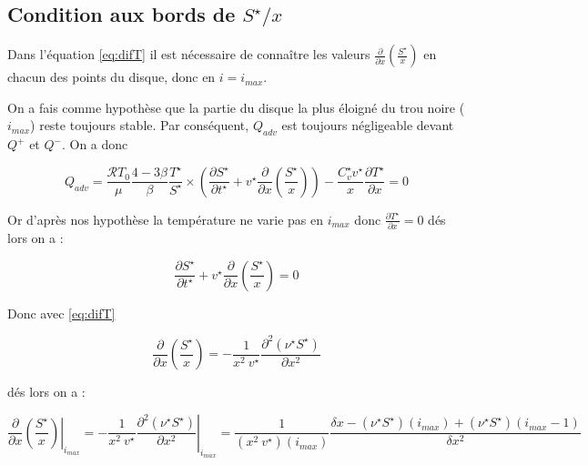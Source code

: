 \subsection{Condition aux bords de $S^{\star}/x$}

Dans l'équation \eqref{eq:difT} il est nécessaire de connaître les valeurs $\frac{\partial}{\partial x}\left(\frac{S^{\star}}{x}\right)$ en chacun des points du disque, donc en $i=i_{max}$. 

On a fais comme hypothèse que la partie du disque la plus éloigné du trou noire ($i_{max}$) reste toujours stable. Par conséquent, $Q_{adv}$ est toujours négligeable devant $Q^+$ et $Q^-$. On a donc 

\begin{equation}
Q_{adv}=\frac{\mathcal{R} T_0}{\mu} \frac{4-3\beta}{\beta} \frac{T^\star}{S^\star} \times
        \left( \frac{\partial S^\star}{\partial t^\star} + v^\star \frac{\partial}{\partial x} \left(\frac{S^\star}{x}\right) \right) -
        \frac{C_v^\star v^\star}{x} \frac{\partial T^\star}{\partial x}=0
\end{equation}

Or d'après nos hypothèse la température ne varie pas en $i_{max}$ donc $\frac{\partial T^\star}{\partial x} =0$ dés lors on a :


\begin{equation}
  \frac{\partial S^{\star}}{\partial t^{\star}} + v^{\star} \frac{\partial}{\partial x} \left(\frac{S^{\star}}{x}\right)=0
\end{equation}

Donc avec \eqref{eq:difT}

\begin{equation}
  \frac{\partial}{\partial x} \left(\frac{S^{\star}}{x}\right) = -\frac{1}{x^2\ v^{\star}} \frac{\partial^2 (\nu^{\star} S^{\star})}{\partial x^2}
\end{equation}

dés lors on a :

\begin{equation}
\left. \frac{\partial}{\partial x} \left(\frac{S^{\star}}{x}\right) \right|_{i_{max}} = \left. -\frac{1}{x^2\ v^{\star}} \frac{\partial^2 (\nu^{\star} S^{\star})}{\partial x^2} \right|_{i_{max}} = \frac{1}{(x^2\ v^{\star})(i_{max})} \frac{\delta x - (\nu^{\star} S^{\star})(i_{max}) + (\nu^{\star} S^{\star})(i_{max}-1)}{\delta x^2}
\end{equation}


